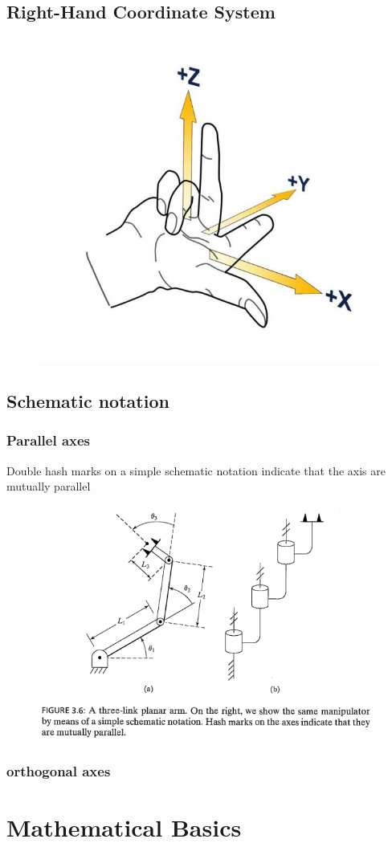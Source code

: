 \documentclass[10pt,a4paper]{article}
\begin{document}
\subsection{Right-Hand Coordinate System}
\begin{figure}[H]
	\includegraphics[width=0.5\columnwidth]{imgs/hand_xyz.jpg}
\end{figure}

\subsection{Schematic notation}

\subsubsection{Parallel axes}
Double hash marks on a simple schematic notation indicate that the axis are mutually parallel
\begin{figure}[H]
	\includegraphics[width=0.5\columnwidth]{imgs/3R_arm.png}
\end{figure}

\subsubsection{orthogonal axes}




\section{Mathematical Basics}
\end{document}
